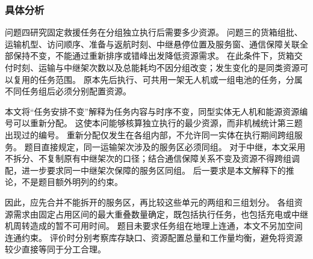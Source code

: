 \subsubsection{具体分析}
\label{sec:q4:analysis}

问题四研究固定救援任务在分组独立执行后需要多少资源。
问题三的货箱组批、运输机型、访问顺序、准备与返航时刻、中继悬停位置及服务窗、通信保障关联全部保持不变，不能通过重新排序或错峰出发降低资源需求。
在此条件下，货箱交付时刻、运输与中继架次数以及总能耗均不因分组改变；发生变化的是同类资源可以复用的任务范围。
原本先后执行、可共用一架无人机或一组电池的任务，分属不同任务组后必须分别配置资源。

本文将“任务安排不变”解释为任务内容与时序不变，同型实体无人机和能源资源编号可以重新分配。
这使本问能够核算独立执行的最少资源，而非机械统计第三题出现过的编号。
重新分配仅发生在各组内部，不允许同一实体在执行期间跨组服务。
题目直接规定，同一运输架次涉及的服务区必须同组。
对于中继，本文采用不拆分、不复制原有中继架次的口径；结合通信保障关系不变及资源不得跨组调配，进一步要求同一中继架次保障的服务区同组。
后一要求是本文解释下的推论，不是题目额外明列的约束。

因此，应先合并不能拆开的服务区，再比较这些单元的两组和三组划分。
各组资源需求由固定占用区间的最大重叠数量确定，既包括执行任务，也包括充电或中继机周转造成的暂不可用时间。
题目未要求任务组在地理上连通，本文不另加空间连通约束。
评价时分别考察库存缺口、资源配置总量和工作量均衡，避免将资源较少直接等同于分工合理。
